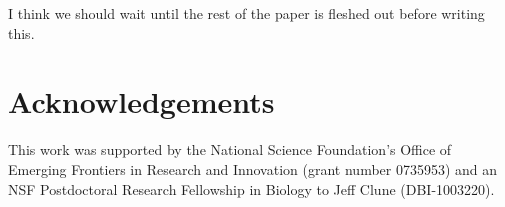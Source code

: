 \documentclass[letterpaper]{article}
\begin{document}
I think we should wait until the rest of the paper is fleshed out before writing this.



\section{Acknowledgements}

This work was supported by the National Science Foundation's Office of
Emerging Frontiers in Research and Innovation (grant number 0735953) and an NSF Postdoctoral Research Fellowship in Biology to Jeff Clune (DBI-1003220).



\footnotesize


\end{document}

